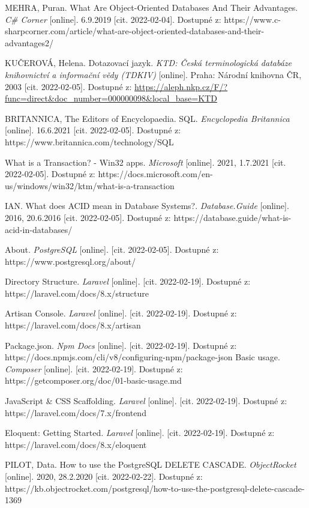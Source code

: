 \begin{thebibliography}{50}
MEHRA, Puran. What Are Object-Oriented Databases And Their Advantages. \textit{C\# Corner} [online]. 6.9.2019 [cit. 2022-02-04]. Dostupné z: https://www.c-sharpcorner.com/article/what-are-object-oriented-databases-and-their-advantages2/

KUČEROVÁ, Helena. Dotazovací jazyk. \textit{KTD: Česká terminologická databáze knihovnictví a informační vědy (TDKIV)} [online]. Praha: Národní knihovna ČR, 2003 [cit. 2022-02-05]. Dostupné z: \url{https://aleph.nkp.cz/F/?func=direct&doc\_number=000000098&local\_base=KTD}

BRITANNICA, The Editors of Encyclopaedia. SQL. \textit{Encyclopedia Britannica} [online]. 16.6.2021 [cit. 2022-02-05]. Dostupné z: https://www.britannica.com/technology/SQL

What is a Transaction? - Win32 apps. \textit{Microsoft} [online]. 2021, 1.7.2021 [cit. 2022-02-05]. Dostupné z: https://docs.microsoft.com/en-us/windows/win32/ktm/what-is-a-transaction

IAN. What does ACID mean in Database Systems?. \textit{Database.Guide} [online]. 2016, 20.6.2016 [cit. 2022-02-05]. Dostupné z: https://database.guide/what-is-acid-in-databases/

About. \textit{PostgreSQL} [online]. [cit. 2022-02-05]. Dostupné z: https://www.postgresql.org/about/

Directory Structure. \textit{Laravel} [online]. [cit. 2022-02-19]. Dostupné z: https://laravel.com/docs/8.x/structure

Artisan Console. \textit{Laravel} [online]. [cit. 2022-02-19]. Dostupné z: https://laravel.com/docs/8.x/artisan

Package.json. \textit{Npm Docs} [online]. [cit. 2022-02-19]. Dostupné z: https://docs.npmjs.com/cli/v8/configuring-npm/package-json
Basic usage. \textit{Composer} [online]. [cit. 2022-02-19]. Dostupné z: https://getcomposer.org/doc/01-basic-usage.md

JavaScript \& CSS Scaffolding. \textit{Laravel} [online]. [cit. 2022-02-19]. Dostupné z: https://laravel.com/docs/7.x/frontend

Eloquent: Getting Started. \textit{Laravel} [online]. [cit. 2022-02-19]. Dostupné z: https://laravel.com/docs/8.x/eloquent

PILOT, Data. How to use the PostgreSQL DELETE CASCADE. \textit{ObjectRocket} [online]. 2020, 28.2.2020 [cit. 2022-02-22]. Dostupné z: https://kb.objectrocket.com/postgresql/how-to-use-the-postgresql-delete-cascade-1369


\end{thebibliography}
